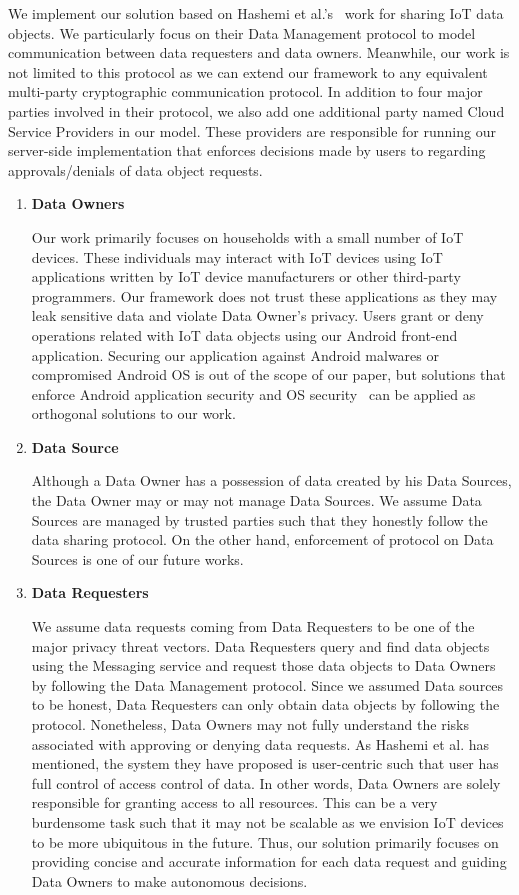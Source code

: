 We implement our solution based on Hashemi et al.'s~\cite{campbell} work for sharing IoT data objects. We particularly focus on their Data Management protocol to model communication between data requesters and data owners. Meanwhile, our work is not limited to this protocol as we can extend our framework to any equivalent multi-party cryptographic communication protocol. In addition to four major parties involved in their protocol, we also add one additional party named Cloud Service Providers in our model. These providers are responsible for running our server-side implementation that enforces decisions made by users to regarding approvals/denials of data object requests. 

\begin{enumerate}
\item \textbf {Data Owners} 

Our work primarily focuses on households with a small number of IoT devices. These individuals may interact with IoT devices using IoT applications written by IoT device manufacturers or other third-party programmers. Our framework does not trust these applications as they may leak sensitive data and violate Data Owner's privacy. Users grant or deny operations related with IoT data objects using our Android front-end  application. Securing our application against Android malwares or compromised Android OS is out of the scope of our paper, but solutions that enforce Android application security and OS security~\cite{tz} can be applied as orthogonal solutions to our work. 

\item \textbf{Data Source} 

Although a Data Owner has a possession of data created by his Data Sources, the Data Owner may or may not manage Data Sources. We assume Data Sources are managed by trusted parties such that they honestly follow the data sharing protocol. On the other hand, enforcement of protocol on Data Sources is one of our future works. 

\item \textbf {Data Requesters}

We assume data requests coming from Data Requesters to be one of the major privacy threat vectors. Data Requesters query and find data objects using the Messaging service and request those data objects to Data Owners by following the Data Management protocol. Since we assumed Data sources to be honest, Data Requesters can only obtain data objects by following the protocol. Nonetheless, Data Owners may not fully understand the risks associated with approving or denying data requests. As Hashemi et al. has mentioned, the system they have proposed is user-centric such that user has full control of access control of data. In other words, Data Owners are solely responsible for granting access to all resources. This can be a very burdensome task such that it may not be scalable as we envision IoT devices to be more ubiquitous in the future. Thus, our solution primarily focuses on providing concise and accurate information for each data request and guiding Data Owners to make autonomous decisions.


\end{enumerate}
